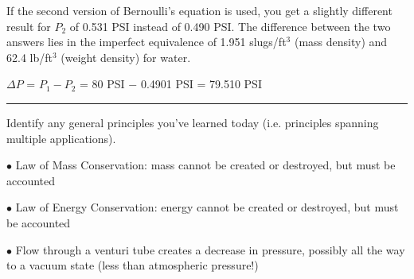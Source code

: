 \vskip 10pt

If the second version of Bernoulli's equation is used, you get a slightly different result for $P_2$ of 0.531 PSI instead of 0.490 PSI.  The difference between the two answers lies in the imperfect equivalence of 1.951 slugs/ft$^{3}$ (mass density) and 62.4 lb/ft$^{3}$ (weight density) for water.

\vskip 10pt

$\Delta P$ = $P_1 - P_2$ = 80 PSI $-$ 0.4901 PSI = 79.510 PSI


\filbreak \vskip 5pt \hrule \vskip 5pt  \vskip 10pt

\noindent
Identify any general principles you've learned today (i.e. principles spanning multiple applications).
\item{$\bullet$} Law of Mass Conservation: mass cannot be created or destroyed, but must be accounted
\item{$\bullet$} Law of Energy Conservation: energy cannot be created or destroyed, but must be accounted
\item{$\bullet$} Flow through a venturi tube creates a decrease in pressure, possibly all the way to a vacuum state (less than atmospheric pressure!)
\medskip

